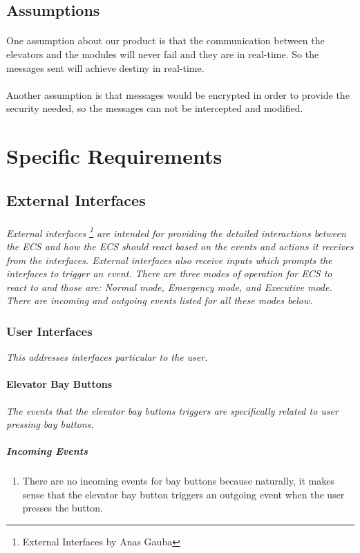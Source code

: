 \documentclass[12pt]{article}
\begin{document}
	\subsection{Assumptions}
		\paragraph{} One assumption about our product is that the communication between 
		the elevators and the modules will never fail and they are in real-time. So the 
		messages sent will achieve destiny in real-time.
		
		\paragraph{} Another assumption is that messages would be encrypted in order 
		to provide the security needed, so the messages can not be intercepted and 
		modified.

\section{Specific Requirements} \label{spec} %
	\subsection{External Interfaces} \label{inter}%
		\paragraph{} \textit{External interfaces \footnote{External Interfaces by Anas Gauba} 
		are intended for providing the detailed interactions between the ECS and how 
		the ECS should react based on the events and actions it receives from the 
		interfaces. External interfaces also receive inputs which prompts the interfaces 
		to trigger an event. There are three modes of operation for ECS to react to 
		and those are: Normal mode, Emergency mode, and Executive mode. There are 
		incoming and outgoing events listed for all these modes below.}
		
		\subsubsection{User Interfaces}
		\textit{This addresses interfaces particular to the user.}
			\paragraph{Elevator Bay Buttons}
			\textit{The events that the elevator bay buttons triggers are specifically 
			related to user pressing bay buttons.}
				\subparagraph{Incoming Events}
					\begin{enumerate}
						\item There are no incoming events for bay buttons because naturally, 
						it makes sense that the elevator bay button triggers an outgoing event 
						when the user presses the button.
					\end{enumerate}
				
\end{document}
